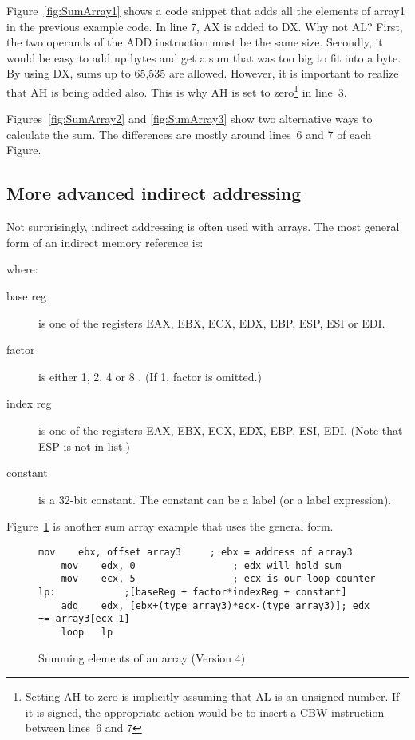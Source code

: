 Figure~\ref{fig:SumArray1} shows a code snippet that adds all the
elements of {\code array1} in the previous example code. In
line 7, AX is added to DX. Why not AL? First, the
two operands of the {\code ADD} instruction must be the same
size. Secondly, it would be easy to add up bytes and get a sum that
was too big to fit into a byte. By using DX, sums up to 65,535 are
allowed. However, it is important to realize that AH is being added
also.  This is why AH is set to zero\footnote{Setting AH to zero is
implicitly assuming that AL is an unsigned number. If it is signed,
the appropriate action would be to insert a {\code CBW} instruction
between lines~6 and 7} in line~3.

Figures~\ref{fig:SumArray2} and \ref{fig:SumArray3} show two alternative
ways to calculate the sum. The differences are mostly around lines~6 and 7
of each Figure.

\subsection{More advanced indirect addressing}

Not surprisingly, indirect addressing is often used with arrays. The most
general form of an indirect memory reference is:
\begin{center}
{}
\end{center}
where:
\begin{description}
\item[base reg] is one of the registers EAX, EBX, ECX, EDX, EBP, ESP, ESI
                or EDI.
\item[factor] is either 1, 2, 4 or 8 . (If 1, factor is omitted.)
\item[index reg] is one of the registers EAX, EBX, ECX, EDX, EBP, ESI, EDI.
                 (Note that ESP is not in list.)
\item[constant] is a 32-bit constant. The constant can be a label (or
                a label expression).
\end{description}

Figure~\ref{fig:SumArray4} is another sum array example that uses the general form. 

\begin{figure}[t]
\begin{lstlisting}[language={[x86masm]Assembler},frame=single]
	mov    ebx, offset array3     ; ebx = address of array3
	mov    edx, 0                 ; edx will hold sum
	mov    ecx, 5                 ; ecx is our loop counter
lp:            ;[baseReg + factor*indexReg + constant]
	add    edx, [ebx+(type array3)*ecx-(type array3)]; edx += array3[ecx-1]
	loop   lp
\end{lstlisting}
\caption{Summing elements of an array (Version 4)\label{fig:SumArray4}}
\end{figure}

